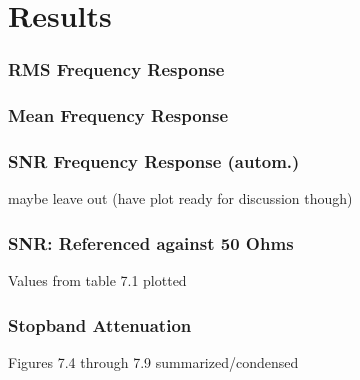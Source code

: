 \section{Results}

\begin{frame}
    \frametitle{RMS Frequency Response}
\end{frame}

\begin{frame}
    \frametitle{Mean Frequency Response}
\end{frame}

\begin{frame}
    \frametitle{SNR Frequency Response (autom.)}
    maybe leave out (have plot ready for discussion though)
\end{frame}

\begin{frame}
    \frametitle{SNR: Referenced against 50 Ohms}
    Values from table 7.1 plotted
\end{frame}

\begin{frame}
    \frametitle{Stopband Attenuation}
    Figures 7.4 through 7.9 summarized/condensed
\end{frame}
